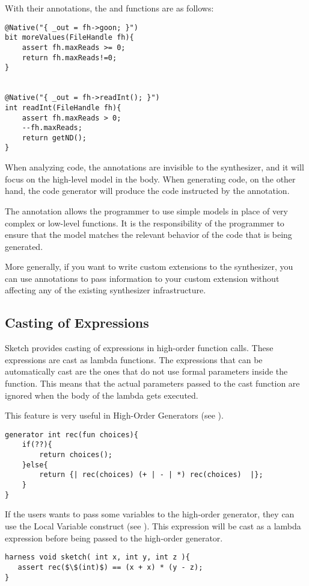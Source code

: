 \begin{Example}
With their annotations, the  and  functions are as follows:
\begin{lstlisting}
@Native("{ _out = fh->goon; }")
bit moreValues(FileHandle fh){
    assert fh.maxReads >= 0; 
    return fh.maxReads!=0;
}


@Native("{ _out = fh->readInt(); }")
int readInt(FileHandle fh){
    assert fh.maxReads > 0;
    --fh.maxReads; 
    return getND();
}
\end{lstlisting}

When analyzing code, the annotations are invisible to the synthesizer, and it will focus on the high-level model in the body. When generating code, on the other hand, the code generator will produce the code instructed by the  annotation.

\end{Example}

The  annotation allows the programmer to use simple models in place of very complex or low-level functions. It is the responsibility of the programmer to ensure that the model matches the relevant behavior of the code that is being generated. 

More generally, if you want to write custom extensions to the \Sk{} synthesizer, you can use annotations to pass information to your custom extension without affecting any of the existing synthesizer infrastructure. 

\subsection{Casting of Expressions}
Sketch provides casting of expressions in high-order function calls. These expressions are cast as lambda functions. The expressions that can be automatically cast are the ones that do not use formal parameters inside the function. This means that the actual parameters passed to the cast function are ignored when the body of the lambda gets executed.

This feature is very useful in High-Order Generators (see ).
\begin{lstlisting}
generator int rec(fun choices){ 
    if(??){ 
        return choices();
    }else{
        return {| rec(choices) (+ | - | *) rec(choices)  |};
    }
}
\end{lstlisting}

If the users wants to pass some variables to the high-order generator, they can use the Local Variable construct (see ). This expression will be cast as a lambda expression before being passed to the high-order generator.
\begin{lstlisting}
harness void sketch( int x, int y, int z ){
   assert rec($\$(int)$) == (x + x) * (y - z);
}
\end{lstlisting}

